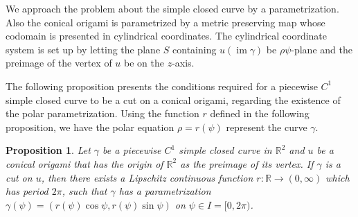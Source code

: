 \documentclass{amsart}
\theoremstyle{plain}
\newtheorem{proposition}[theorem]{Proposition}
\theoremstyle{definition}
\theoremstyle{remark}
\DeclareMathOperator{\im}{im}
\begin{document}
We approach the problem about the simple closed curve by a parametrization.
Also the conical origami is parametrized by a metric preserving map whose codomain is presented in cylindrical coordinates.
The cylindrical coordinate system is set up by letting the plane $S$ containing $u(\im\gamma)$ be $\rho\psi$-plane and the preimage of the vertex of $u$ be on the $z$-axis.

The following proposition presents the conditions required for a piecewise $C^1$ simple closed curve to be a cut on a conical origami, regarding the existence of the polar parametrization.
Using the function $r$ defined in the following proposition, we have the polar equation $\rho=r(\psi)$ represent the curve $\gamma$.



\begin{proposition}\label{2.1} %
Let $\gamma$ be a piecewise $C^1$ simple closed curve in $\mathbb{R}^2$ and $u$ be a conical origami that has the origin of $\mathbb{R}^2$ as the preimage of its vertex.
If $\gamma$ is a cut on $u$, then there exists a Lipschitz continuous function $r \colon \mathbb{R}\to(0,\infty)$ which has period $2\pi$, such that $\gamma$ has a parametrization $\gamma(\psi)=(r(\psi)\cos\psi,r(\psi)\sin\psi)$ on $\psi\in I=[0,2\pi)$.
\end{proposition}
\end{document}
